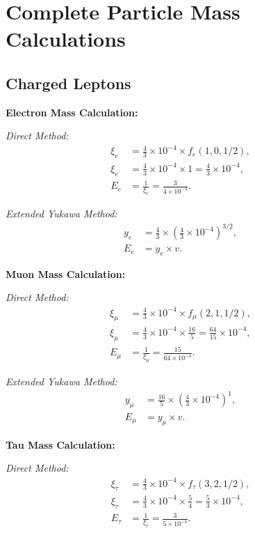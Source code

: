 \documentclass[12pt,a4paper]{article}
\begin{document}
	\section{Complete Particle Mass Calculations}
	\subsection{Charged Leptons}
	
	\textbf{Electron Mass Calculation:}
	
	\textit{Direct Method:}
	\begin{align}
		\xi_e &= \frac{4}{3} \times 10^{-4} \times f_e(1,0,1/2), \\
		\xi_e &= \frac{4}{3} \times 10^{-4} \times 1 = \frac{4}{3} \times 10^{-4}, \\
		E_e &= \frac{1}{\xi_e} = \frac{3}{4 \times 10^{-4}}.
	\end{align}
	
	\textit{Extended Yukawa Method:}
	\begin{align}
		y_e &= \frac{4}{3} \times \left(\frac{4}{3} \times 10^{-4}\right)^{3/2}, \\
		E_e &= y_e \times v.
	\end{align}
	
	\textbf{Muon Mass Calculation:}
	
	\textit{Direct Method:}
	\begin{align}
		\xi_\mu &= \frac{4}{3} \times 10^{-4} \times f_\mu(2,1,1/2), \\
		\xi_\mu &= \frac{4}{3} \times 10^{-4} \times \frac{16}{5} = \frac{64}{15} \times 10^{-4}, \\
		E_{\mu} &= \frac{1}{\xi_\mu} = \frac{15}{64 \times 10^{-4}}.
	\end{align}
	
	\textit{Extended Yukawa Method:}
	\begin{align}
		y_\mu &= \frac{16}{5} \times \left(\frac{4}{3} \times 10^{-4}\right)^1, \\
		E_\mu &= y_\mu \times v.
	\end{align}
	
	\textbf{Tau Mass Calculation:}
	
	\textit{Direct Method:}
	\begin{align}
		\xi_\tau &= \frac{4}{3} \times 10^{-4} \times f_\tau(3,2,1/2), \\
		\xi_\tau &= \frac{4}{3} \times 10^{-4} \times \frac{5}{4} = \frac{5}{3} \times 10^{-4}, \\
		E_{\tau} &= \frac{1}{\xi_\tau} = \frac{3}{5 \times 10^{-4}}.
	\end{align}
	
\end{document}
